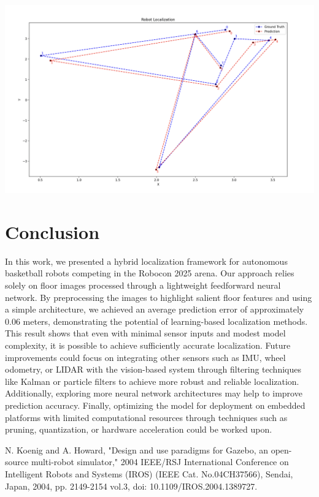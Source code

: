 \documentclass[a4paper]{article}
\begin{document}
\begin{multicols}{2}
{ \centering
 \includegraphics[scale=0.2]{results/comparison.png}\\
 \label{pinki}
}

\section{Conclusion}  
\par \noindent
In this work, we presented a hybrid localization framework for autonomous basketball robots competing 
in the Robocon 2025 arena. Our approach relies solely on floor images processed through a lightweight
feedforward neural network. By preprocessing the images to highlight salient floor features and using a simple architecture, 
we achieved an average prediction error of approximately 0.06 meters, demonstrating the potential of 
learning-based localization methods. This result shows that even with minimal sensor inputs and modest 
model complexity, it is possible to achieve sufficiently accurate localization. Future improvements could 
focus on integrating other sensors such as IMU, wheel odometry, or LIDAR with the vision-based system 
through filtering techniques like Kalman or particle filters to achieve more robust and reliable 
localization. Additionally, exploring more neural network architectures may help to improve prediction 
accuracy. Finally, optimizing the model for deployment on embedded platforms with limited computational
resources through techniques such as pruning, quantization, or hardware acceleration could be worked upon.

\begin{thebibliography}{99}

N. Koenig and A. Howard, "Design and use paradigms for Gazebo, an open-source 
multi-robot simulator," 2004 IEEE/RSJ International Conference on Intelligent Robots 
and Systems (IROS) (IEEE Cat. No.04CH37566), Sendai, Japan, 2004, pp. 2149-2154 vol.3, 
doi: 10.1109/IROS.2004.1389727.
  

\end{thebibliography}
\end{multicols}
\end{document}
